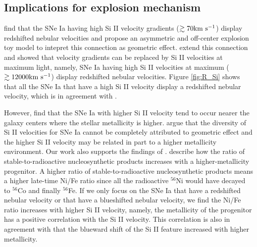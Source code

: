\documentclass[twocolumn]{aastex631}
\begin{document}
\subsection{Implications for explosion mechanism \label{subsec:implications}} 

\citet{2010Natur.466...82M} find that the SNe Ia having high Si II velocity gradients ($\rm \gtrsim 70 km\ s^{-1}$) display redshifted nebular velocities and propose an asymmetric and off-center explosion toy model to intepret this connection as geometric effect. \citet{2013MNRAS.430.1030S} extend this connection and showed that velocity gradients can be replaced by Si II velocities at maximum light, namely, SNe Ia having high Si II velocities at maximum ($\rm \gtrsim 12000 km\ s^{-1}$) display redshifted nebular velocities. Figure \ref{fig:R_Si} shows that all the SNe Ia that have a high Si II velocity display a redshifted nebular velocity, which is in agreement with \citet{2013MNRAS.430.1030S}.

However, \citet{2013Sci...340..170W} find that the SNe Ia with higher Si II velocity tend to occur nearer the galaxy centers where the stellar metallicity is higher. \citet{2013Sci...340..170W} argue that the diversity of Si II velocities for SNe Ia cannot be completely attributed to geometric effect and the higher Si II velocity may be related in part to a higher metallicity environment. Our work also supports the findings of \citet{2013Sci...340..170W}. \citet{2003ApJ...590L..83T} describe how the ratio of stable-to-radioactive nucleosynthetic products increases with a higher-metallicity progenitor. A higher ratio of stable-to-radioactive nucleosynthetic products means a higher late-time Ni/Fe ratio since all the radioactive $^{56}$Ni would have decayed to $^{56}$Co and finally $^{56}$Fe. If we only focus on the SNe Ia that have a redshifted nebular velocity or that have a blueshifted nebular velocity, we find the Ni/Fe ratio increases with higher Si II velocity, namely, the metallicity of the progenitor has a positive correlation with the Si II velocity. This correlation is also in agreement with \citet{2000ApJ...530..966L} that the blueward shift of the Si II feature increased with higher metallicity.   
\end{document}

